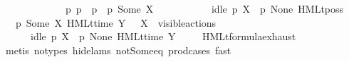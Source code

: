 \begin{isabellebody}
\ \ \ \ \ \ \ \ {\isacharparenleft}{\kern0pt}{\isacharparenleft}{\kern0pt}{\isasymalpha}\ {\isacharequal}{\kern0pt}\ {\isasymtau}{\isacharparenright}{\kern0pt}\ {\isasymand}\ {\isacharparenleft}{\kern0pt}{\isasymexists}\ p{\isacharprime}{\kern0pt}{\isachardot}{\kern0pt}\ p\ {\isasymlongmapsto}{\isasymtau}\ p{\isacharprime}{\kern0pt}\ {\isasymand}\ p{\isacharprime}{\kern0pt}\ {\isasymTTurnstile}{\isacharquery}{\kern0pt}{\isacharbrackleft}{\kern0pt}Some\ X{\isacharbrackright}{\kern0pt}\ {\isasymphi}{\isacharparenright}{\kern0pt}{\isacharparenright}{\kern0pt}\ {\isasymor}\ \isanewline
\ \ \ \ \ \ \ \ {\isacharparenleft}{\kern0pt}{\isacharparenleft}{\kern0pt}idle\ p\ X{\isacharparenright}{\kern0pt}\ {\isasymand}\ {\isacharparenleft}{\kern0pt}p\ {\isasymTTurnstile}{\isacharquery}{\kern0pt}{\isacharbrackleft}{\kern0pt}None{\isacharbrackright}{\kern0pt}\ {\isacharparenleft}{\kern0pt}HMLt{\isacharunderscore}{\kern0pt}poss\ {\isasymalpha}\ {\isasymphi}{\isacharparenright}{\kern0pt}{\isacharparenright}{\kern0pt}{\isacharparenright}{\kern0pt}{\isacharparenright}{\kern0pt}{\isacharparenright}{\kern0pt}{\isacartoucheclose}\ \isanewline
\ \ {\isacharbar}{\kern0pt}\ {\isacartoucheopen}{\isacharparenleft}{\kern0pt}p\ {\isasymTTurnstile}{\isacharquery}{\kern0pt}{\isacharbrackleft}{\kern0pt}Some\ X{\isacharbrackright}{\kern0pt}\ {\isacharparenleft}{\kern0pt}HMLt{\isacharunderscore}{\kern0pt}time\ Y\ {\isasymphi}{\isacharparenright}{\kern0pt}{\isacharparenright}{\kern0pt}\ {\isacharequal}{\kern0pt}\ {\isacharparenleft}{\kern0pt}X\ {\isasymsubseteq}\ visible{\isacharunderscore}{\kern0pt}actions\ {\isasymand}\isanewline
\ \ \ \ \ \ {\isacharparenleft}{\kern0pt}{\isacharparenleft}{\kern0pt}idle\ p\ X{\isacharparenright}{\kern0pt}\ {\isasymand}\ {\isacharparenleft}{\kern0pt}p\ {\isasymTTurnstile}{\isacharquery}{\kern0pt}{\isacharbrackleft}{\kern0pt}None{\isacharbrackright}{\kern0pt}\ {\isacharparenleft}{\kern0pt}HMLt{\isacharunderscore}{\kern0pt}time\ Y\ {\isasymphi}{\isacharparenright}{\kern0pt}{\isacharparenright}{\kern0pt}{\isacharparenright}{\kern0pt}{\isacharparenright}{\kern0pt}{\isacartoucheclose}\isanewline
%
\isadelimproof
\ \ %
\endisadelimproof
%
\isatagproof
{}\isamarkupfalse%
\ HMLt{\isacharunderscore}{\kern0pt}formula{\isachardot}{\kern0pt}exhaust\isanewline
\ \ \isamarkupfalse%
\ {\isacharparenleft}{\kern0pt}metis\ {\isacharparenleft}{\kern0pt}no{\isacharunderscore}{\kern0pt}types{\isacharcomma}{\kern0pt}\ hide{\isacharunderscore}{\kern0pt}lams{\isacharparenright}{\kern0pt}\ not{\isacharunderscore}{\kern0pt}Some{\isacharunderscore}{\kern0pt}eq\ prod{\isacharunderscore}{\kern0pt}cases{}{\isacharcomma}{\kern0pt}\ fast{\isacharplus}{\kern0pt}{\isacharparenright}{\kern0pt}%

\end{isabellebody}

